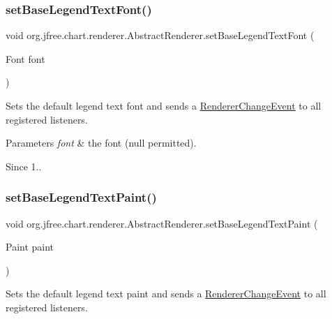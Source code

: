 \subsubsection{\texorpdfstring{set\+Base\+Legend\+Text\+Font()}{setBaseLegendTextFont()}}
{\footnotesize\ttfamily void org.\+jfree.\+chart.\+renderer.\+Abstract\+Renderer.\+set\+Base\+Legend\+Text\+Font (\begin{DoxyParamCaption}\item[{Font}]{font }\end{DoxyParamCaption})}

Sets the default legend text font and sends a \mbox{\hyperlink{}{Renderer\+Change\+Event}} to all registered listeners.


\begin{DoxyParams}{Parameters}
{\em font} & the font ({\ttfamily null} permitted).\\
\hline
\end{DoxyParams}
\begin{DoxySince}{Since}
1.. 
\end{DoxySince}
\mbox{\label{classorg_1_1jfree_1_1chart_1_1renderer_1_1_abstract_renderer_ab11c71f12d757354dde53d37579fc15b}} 
\subsubsection{\texorpdfstring{set\+Base\+Legend\+Text\+Paint()}{setBaseLegendTextPaint()}}
{\footnotesize\ttfamily void org.\+jfree.\+chart.\+renderer.\+Abstract\+Renderer.\+set\+Base\+Legend\+Text\+Paint (\begin{DoxyParamCaption}\item[{Paint}]{paint }\end{DoxyParamCaption})}

Sets the default legend text paint and sends a \mbox{\hyperlink{}{Renderer\+Change\+Event}} to all registered listeners.


